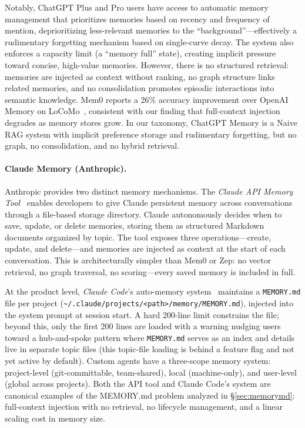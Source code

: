 Notably, ChatGPT Plus and Pro users have access to automatic memory
management that prioritizes memories based on recency and frequency of
mention, deprioritizing less-relevant memories to the
``background''---effectively a rudimentary forgetting mechanism based on
single-curve decay. The system also enforces a capacity limit (a
``memory full'' state), creating implicit pressure toward concise,
high-value memories. However, there is no structured retrieval:
memories are injected as context without ranking, no graph structure
links related memories, and no consolidation promotes episodic
interactions into semantic knowledge. Mem0 reports a 26\% accuracy
improvement over OpenAI Memory on LoCoMo~\cite{choudhary2025mem0},
consistent with our finding that full-context injection degrades as
memory stores grow. In our taxonomy, ChatGPT Memory is a Naive RAG
system with implicit preference storage and rudimentary forgetting, but
no graph, no consolidation, and no hybrid retrieval.

\paragraph{Claude Memory (Anthropic).}
Anthropic provides two distinct memory mechanisms. The \emph{Claude API
Memory Tool}~\cite{anthropic2026memorytool} enables developers to give
Claude persistent memory across conversations through a file-based
storage directory. Claude autonomously decides when to save, update, or
delete memories, storing them as structured Markdown documents organized
by topic. The tool exposes three operations---create, update, and
delete---and memories are injected as context at the start of each
conversation. This is architecturally simpler than Mem0 or Zep: no
vector retrieval, no graph traversal, no scoring---every saved memory
is included in full.

At the product level, \emph{Claude Code}'s auto-memory
system~\cite{gurgone2026claudememory} maintains a
\texttt{MEMORY.md} file per project
(\texttt{\~{}/.claude/\allowbreak{}projects/\allowbreak{}<path>/\allowbreak{}memory/\allowbreak{}MEMORY.md}), injected into
the system prompt at session start. A hard 200-line limit constrains
the file; beyond this, only the first 200 lines are loaded with a
warning nudging users toward a hub-and-spoke pattern where
\texttt{MEMORY.md} serves as an index and details live in separate
topic files (this topic-file loading is behind a feature flag and not
yet active by default). Custom agents have a three-scope memory
system: project-level (git-committable, team-shared), local
(machine-only), and user-level (global across projects). Both the API
tool and Claude Code's system are canonical examples of the
MEMORY.md problem analyzed in \S\ref{sec:memorymd}: full-context
injection with no retrieval, no lifecycle management, and a linear
scaling cost in memory size.

